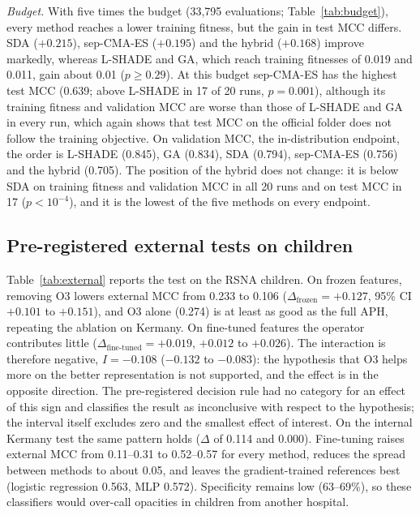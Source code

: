 \documentclass[10pt,letterpaper]{article}
\begin{document}
\emph{Budget.} With five times the budget (33,795 evaluations; Table~\ref{tab:budget}), every method reaches a lower training fitness, but the gain in test MCC differs. SDA ($+0.215$), sep-CMA-ES ($+0.195$) and the hybrid ($+0.168$) improve markedly, whereas L-SHADE and GA, which reach training fitnesses of 0.019 and 0.011, gain about 0.01 ($p\ge 0.29$). At this budget sep-CMA-ES has the highest test MCC (0.639; above L-SHADE in 17 of 20 runs, $p=0.001$), although its training fitness and validation MCC are worse than those of L-SHADE and GA in every run, which again shows that test MCC on the official folder does not follow the training objective. On validation MCC, the in-distribution endpoint, the order is L-SHADE (0.845), GA (0.834), SDA (0.794), sep-CMA-ES (0.756) and the hybrid (0.705). The position of the hybrid does not change: it is below SDA on training fitness and validation MCC in all 20 runs and on test MCC in 17 ($p<10^{-4}$), and it is the lowest of the five methods on every endpoint.







\subsection{Pre-registered external tests on children}\label{sec:external}
Table~\ref{tab:external} reports the test on the RSNA children. On frozen features, removing O3 lowers external MCC from 0.233 to 0.106 ($\Delta_{\mathrm{frozen}}=+0.127$, 95\% CI $+0.101$ to $+0.151$), and O3 alone (0.274) is at least as good as the full APH, repeating the ablation on Kermany. On fine-tuned features the operator contributes little ($\Delta_{\mathrm{fine\text{-}tuned}}=+0.019$, $+0.012$ to $+0.026$). The interaction is therefore negative, $I=-0.108$ ($-0.132$ to $-0.083$): the hypothesis that O3 helps more on the better representation is not supported, and the effect is in the opposite direction. The pre-registered decision rule had no category for an effect of this sign and classifies the result as inconclusive with respect to the hypothesis; the interval itself excludes zero and the smallest effect of interest. On the internal Kermany test the same pattern holds ($\Delta$ of 0.114 and 0.000). Fine-tuning raises external MCC from 0.11--0.31 to 0.52--0.57 for every method, reduces the spread between methods to about 0.05, and leaves the gradient-trained references best (logistic regression 0.563, MLP 0.572). Specificity remains low (63--69\%), so these classifiers would over-call opacities in children from another hospital.
\end{document}
